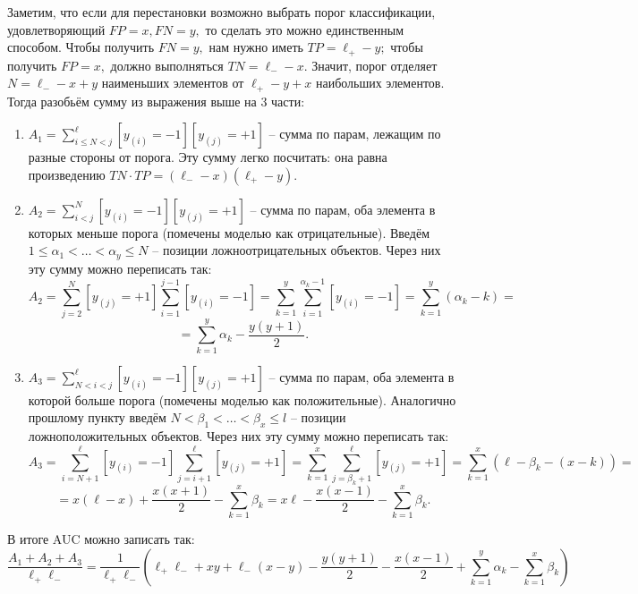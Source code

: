 \documentclass[12pt,a4paper]{article}
\begin{document}
\begin{esSolution}
Заметим, что если для перестановки возможно выбрать порог классификации, удовлетворяющий $FP = x, FN = y,$ то сделать это можно единственным способом.
Чтобы получить $FN = y,$ нам нужно иметь $TP = \ell_{+} - y;$ чтобы получить $FP = x,$ должно выполняться $TN = \ell_{-} - x.$
Значит, порог отделяет $N = \ell_{-} - x + y$ наименьших элементов от $\ell_{+} - y + x$ наибольших элементов.
Тогда разобьём сумму из выражения выше на 3 части:
\begin{enumerate}
    \item $A_1 = \sum\limits_{i \leqslant N < j}^{\ell} [y_{(i)} = -1] [y_{(j)} = +1]$ -- сумма по парам, лежащим по разные стороны от порога.
    Эту сумму легко посчитать: она равна произведению $TN \cdot TP = (\ell_{-} - x)(\ell_{+} - y).$
    \item $A_2 = \sum\limits_{i < j}^{N} [y_{(i)} = -1] [y_{(j)} = +1]$ -- сумма по парам, оба элемента в которых меньше порога (помечены моделью как отрицательные).
    Введём $1 \leqslant \alpha_1 < \ldots < \alpha_y \leqslant N$ -- позиции ложноотрицательных объектов.
    Через них эту сумму можно переписать так:
    $$A_2 = \sum\limits_{j = 2}^{N}[y_{(j)} = +1]\sum\limits_{i = 1}^{j - 1}[y_{(i)} = -1] = \sum\limits_{k = 1}^y\sum\limits_{i = 1}^{\alpha_k - 1}[y_{(i)} = -1] = \sum\limits_{k = 1}^y (\alpha_k - k) =$$
    $$=\sum\limits_{k = 1}^y \alpha_k - \frac{y(y + 1)}{2}.
    $$
    \item $A_3 = \sum\limits_{N < i < j}^{\ell} [y_{(i)} = -1] [y_{(j)} = +1]$ -- сумма по парам, оба элемента в которой больше порога (помечены моделью как положительные).
    Аналогично прошлому пункту введём $N < \beta_1 < \ldots < \beta_x \leqslant l$ -- позиции ложноположительных объектов.
    Через них эту сумму можно переписать так:
    $$
    A_3 = \sum\limits_{i = N + 1}^{\ell}[y_{(i)} = -1]\sum\limits_{j = i + 1}^{\ell}[y_{(j)} = +1] = \sum\limits_{k = 1}^x \sum\limits_{j = \beta_k + 1}^{\ell}[y_{(j)} = +1] = \sum\limits_{k = 1}^x (\ell - \beta_k - (x - k)) =
    $$
    $$
    = x(\ell - x) + \frac{x(x + 1)}{2} - \sum\limits_{k = 1}^x \beta_k = x\ell -\frac{x(x - 1)}{2} - \sum\limits_{k = 1}^x \beta_k.
    $$
\end{enumerate}
В итоге AUC можно записать так:
$$
\frac{A_1 + A_2 + A_3}{\ell_{+}\ell_{-}} = \frac{1}{\ell_{+}\ell_{-}}\left(\ell_{+}\ell_{-} + xy + \ell_{-}(x - y) - \frac{y(y + 1)}{2} - \frac{x(x - 1)}{2} + \sum\limits_{k = 1}^y \alpha_k - \sum\limits_{k = 1}^x \beta_k\right)
$$


\end{esSolution}
\end{document}
